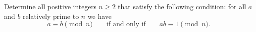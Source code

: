 \begin{problem}
    Determine all positive integers $ n\geq 2$ that satisfy the following condition: for all $ a$ and $ b$ relatively prime to $ n$ we have\[a \equiv b \pmod n\qquad\text{if and only if}\qquad ab\equiv 1 \pmod n.\]

    \label{00ISLN1}
\end{problem}